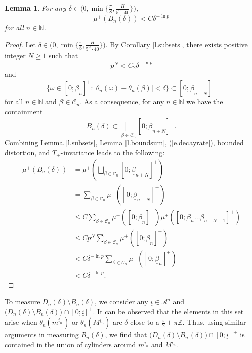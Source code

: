 \documentclass{amsart}
\newtheorem{lemma}{Lemma}
\newcommand{\NN}{\mathbb{N}}
\newcommand{\ZZ}{\mathbb{Z}}
\newcommand{\A}{\mathcal{A}}
\newcommand{\C}{\mathcal{C}}
\begin{document}
\begin{lemma}\label{l.thetacylinder}
    For any $\delta\in \Big(0, \min\{\frac{\pi}{8}, \frac{H}{5^\alpha \cdot 40}\}\Big)$,   
    \[\mu^+(B_n(\delta)) < C\delta^{-\ln p}\]
    for all $n\in \NN$.
\end{lemma}
\begin{proof}
    Let $\delta\in \Big(0, \min\{\frac{\pi}{8}, \frac{H}{5^\alpha \cdot 40}\}\Big)$. By Corollary \ref{l.subsets}, there exists positive integer $N\geq 1$ such that 
    \[p^{N} < C_2\delta^{-\ln p}\]
    and
    \[\{\omega\in [0;\underline{\beta}_n]^+: |\theta_n(\omega) -\theta_n(\beta)| < \delta\} \subset [0;\underline{\beta}_{n+N}]^+\]
    for all $n\in \NN$ and $\beta\in \C_n$. As a consequence, for any $n\in \NN$ we have the containment
    \[B_n(\delta) \subset \bigsqcup_{\beta\in \C_n}[0;\underline{\beta}_{n+N}]^+.\]
    Combining Lemma \ref{l.subsets}, Lemma \ref{l.boundsum}, (\ref{e.decayrate}), bounded distortion, and $T_+$-invariance leads to the following:
    \begin{align*}
        \mu^+(B_n(\delta)) &= \mu^+(\bigsqcup_{\beta\in \C_n}[0;\underline{\beta}_{n+N}]^+)\\
        &= \sum_{\beta \in \C_n}\mu^+([0;\underline{\beta}_{n+N}]^+)\\
        &\leq C\sum_{\beta \in \C_n}\mu^+([0;\underline{\beta}_{n}]^+)\mu^+([0;\beta_{n}\dots\beta_{n+N-1}]^+)\\
        &\leq Cp^{N} \sum_{\beta \in \C_n}\mu^+([0;\underline{\beta}_{n}]^+)\\
        &< C\delta^{-\ln p} \sum_{\beta \in \C_n}\mu^+([0;\underline{\beta}_{n}]^+)\\
        &< C\delta^{-\ln p}.
    \end{align*}
\end{proof}

To measure $D_n(\delta)\setminus B_n(\delta)$, we consider any $\underline{i}\in \A^n$ and $\Big(D_n(\delta)\setminus B_n(\delta)\Big)\cap [0;\underline{i}]^+$. It can be observed that the elements in this set arise when $\theta_n(m^{\underline{i}_n})$ or $ \theta_n(M^{\underline{i}_n})$ are $\delta$-close to a $\frac{\pi}{2} + \pi\ZZ$. Thus, using similar arguments in measuring $B_n(\delta)$, we find that $\Big(D_n(\delta)\setminus B_n(\delta)\Big)\cap [0;\underline{i}]^+$ is contained in the union of cylinders around $m^{\underline{i}_n}$ and $M^{\underline{i}_n}$. 
\end{document}
